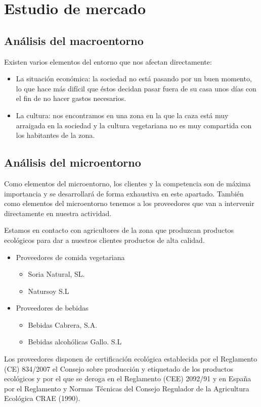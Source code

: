 \chapter{Estudio de mercado}
\label{chap:mercado}

\section{Análisis del macroentorno}
\label{sec:macroentorno}

Existen varios elementos del entorno que nos afectan directamente:

\begin{itemize}
\item La situación económica: la sociedad no está pasando por un buen  momento, lo que hace más difícil que éstos decidan pasar fuera de su casa unos días con el fin de no hacer gastos necesarios.
\item La cultura: nos encontramos en una zona en la que la caza está muy arraigada en la sociedad y la cultura vegetariana no es muy compartida con los habitantes de la zona.
\end{itemize}

\section{Análisis del microentorno}
\label{sec:microentorno}
Como elementos del microentorno, los clientes y la competencia son de máxima importancia y se desarrollará de forma exhaustiva en este apartado. También como elementos del microentorno tenemos a los proveedores que van a intervenir directamente en nuestra actividad.

Estamos en contacto con agricultores de la zona que produzcan productos ecológicos para dar a nuestros clientes productos de alta calidad.

\begin{itemize}
\item Proveedores de comida vegetariana
	\begin{itemize}
	\item Soria Natural, SL.
	\item Natursoy S.L
	\end{itemize}
\item Proveedores de bebidas
	\begin{itemize}
	\item Bebidas Cabrera, S.A.
	\item Bebidas alcohólicas Gallo. S.L
	\end{itemize}
\end{itemize}
Los proveedores disponen de certificación ecológica establecida por el Reglamento (CE) 834/2007 el Consejo sobre producción y etiquetado de los productos ecológicos y por el que se deroga en el Reglamento (CEE) 2092/91 y en España por el Reglamento y Normas Técnicas del Consejo Regulador de la Agricultura Ecológica CRAE (1990).

